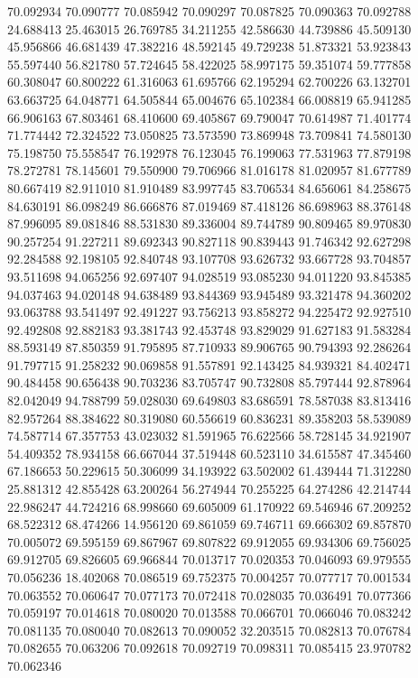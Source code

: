 70.092934
70.090777
70.085942
70.090297
70.087825
70.090363
70.092788
24.688413
25.463015
26.769785
34.211255
42.586630
44.739886
45.509130
45.956866
46.681439
47.382216
48.592145
49.729238
51.873321
53.923843
55.597440
56.821780
57.724645
58.422025
58.997175
59.351074
59.777858
60.308047
60.800222
61.316063
61.695766
62.195294
62.700226
63.132701
63.663725
64.048771
64.505844
65.004676
65.102384
66.008819
65.941285
66.906163
67.803461
68.410600
69.405867
69.790047
70.614987
71.401774
71.774442
72.324522
73.050825
73.573590
73.869948
73.709841
74.580130
75.198750
75.558547
76.192978
76.123045
76.199063
77.531963
77.879198
78.272781
78.145601
79.550900
79.706966
81.016178
81.020957
81.677789
80.667419
82.911010
81.910489
83.997745
83.706534
84.656061
84.258675
84.630191
86.098249
86.666876
87.019469
87.418126
86.698963
88.376148
87.996095
89.081846
88.531830
89.336004
89.744789
90.809465
89.970830
90.257254
91.227211
89.692343
90.827118
90.839443
91.746342
92.627298
92.284588
92.198105
92.840748
93.107708
93.626732
93.667728
93.704857
93.511698
94.065256
92.697407
94.028519
93.085230
94.011220
93.845385
94.037463
94.020148
94.638489
93.844369
93.945489
93.321478
94.360202
93.063788
93.541497
92.491227
93.756213
93.858272
94.225472
92.927510
92.492808
92.882183
93.381743
92.453748
93.829029
91.627183
91.583284
88.593149
87.850359
91.795895
87.710933
89.906765
90.794393
92.286264
91.797715
91.258232
90.069858
91.557891
92.143425
84.939321
84.402471
90.484458
90.656438
90.703236
83.705747
90.732808
85.797444
92.878964
82.042049
94.788799
59.028030
69.649803
83.686591
78.587038
83.813416
82.957264
88.384622
80.319080
60.556619
60.836231
89.358203
58.539089
74.587714
67.357753
43.023032
81.591965
76.622566
58.728145
34.921907
54.409352
78.934158
66.667044
37.519448
60.523110
34.615587
47.345460
67.186653
50.229615
50.306099
34.193922
63.502002
61.439444
71.312280
25.881312
42.855428
63.200264
56.274944
70.255225
64.274286
42.214744
22.986247
44.724216
68.998660
69.605009
61.170922
69.546946
67.209252
68.522312
68.474266
14.956120
69.861059
69.746711
69.666302
69.857870
70.005072
69.595159
69.867967
69.807822
69.912055
69.934306
69.756025
69.912705
69.826605
69.966844
70.013717
70.020353
70.046093
69.979555
70.056236
18.402068
70.086519
69.752375
70.004257
70.077717
70.001534
70.063552
70.060647
70.077173
70.072418
70.028035
70.036491
70.077366
70.059197
70.014618
70.080020
70.013588
70.066701
70.066046
70.083242
70.081135
70.080040
70.082613
70.090052
32.203515
70.082813
70.076784
70.082655
70.063206
70.092618
70.092719
70.098311
70.085415
23.970782
70.062346
